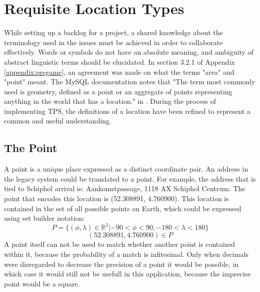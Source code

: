 \section{Requisite Location Types}
While setting up a backlog for a project, a shared knowledge about the terminology used in the issues must be achieved in order to collaborate effectively. Words or symbols do not have an absolute meaning, and ambiguity of abstract linguistic terms should be elucidated. In section 3.2.1 of Appendix \ref{appendix:pregame}, an agreement was made on what the terms "area" and "point" meant. The MySQL documentation notes that "The term most commonly used is geometry, defined as a point or an aggregate of points representing anything in the world that has a location." in \cite{MySQL-Spat}. During the process of implementing TPS, the definitions of a location have been refined to represent a common and useful understanding.

\subsection{The Point}
A point is a unique place expressed as a distinct coordinate pair. An address in the legacy system could be translated to a point. For example, the address that is tied to Schiphol arrival is: Aankomstpassage, 1118 AX Schiphol Centrum.
The point that encodes this location is (52.308891, 4.760900). This location is contained in the set of all possible points on Earth, which could be expressed using set builder notation:
\[P = \{(\phi,\lambda) \in \mathbb{R}^2 | -90 < \phi < 90, -180 < \lambda < 180 \}\]
\[(52.308891, 4.760900) \in P\]
A point itself can not be used to match whether another point is contained within it, because the probability of a match is infitesimal. Only when decimals were disregarded to decrease the precision of a point it would be possible, in which case it would still not be usefull in this application, because the imprecise point would be a square.

